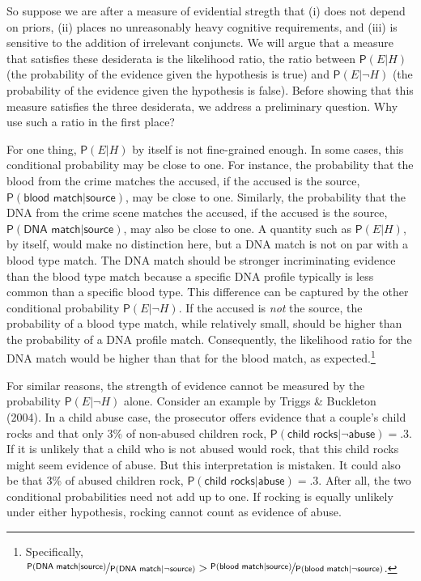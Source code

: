 \documentclass[
  10pt,
  dvipsnames,enabledeprecatedfontcommands]{scrartcl}
\newcommand{\pr}[1]{\mathsf{P}(#1)}
\begin{document}
So suppose we are after a measure of evidential stregth that (i) does
not depend on priors, (ii) places no unreasonably heavy cognitive
requirements, and (iii) is sensitive to the addition of irrelevant
conjuncts. We will argue that a measure that satisfies these desiderata
is the likelihood ratio, the ratio between \(\pr{E \vert H}\) (the
probability of the evidence given the hypothesis is true) and
\(\pr{E \vert \neg H}\) (the probability of the evidence given the
hypothesis is false). Before showing that this measure satisfies the
three desiderata, we address a preliminary question. Why use such a
ratio in the first place?

For one thing, \(\pr{E \vert H}\) by itself is not fine-grained enough.
In some cases, this conditional probability may be close to one. For
instance, the probability that the blood from the crime matches the
accused, if the accused is the source,
\(\pr{\textsf{blood match} \vert \textsf{source}}\), may be close to
one. Similarly, the probability that the DNA from the crime scene
matches the accused, if the accused is the source,
\(\pr{\textsf{DNA match} \vert \textsf{source}}\), may also be close to
one. A quantity such as \(\pr{E \vert H}\), by itself, would make no
distinction here, but a DNA match is not on par with a blood type match.
The DNA match should be stronger incriminating evidence than the blood
type match because a specific DNA profile typically is less common than
a specific blood type. This difference can be captured by the other
conditional probability \(\pr{E \vert \neg H}\). If the accused is
\textit{not} the source, the probability of a blood type match, while
relatively small, should be higher than the probability of a DNA profile
match. Consequently, the likelihood ratio for the DNA match would be
higher than that for the blood match, as expected.\footnote{Specifically,
  \(\nicefrac{\pr{\textsf{DNA match} \vert \textsf{source}}}{\pr{\textsf{DNA match} \vert \neg \textsf{source}}} > \nicefrac{\pr{\textsf{blood match} \vert \textsf{source}}}{\pr{\textsf{blood match} \vert \neg \textsf{source}}}\).}

For similar reasons, the strength of evidence cannot be measured by the
probability \(\pr{E \vert \neg H}\) alone. Consider an example by Triggs
\& Buckleton (2004). In a child abuse case, the prosecutor offers
\label{text:rock} evidence that a couple's child rocks and that only 3\%
of non-abused children rock,
\(\pr{\textsf{child rocks} \vert \neg \textsf{abuse}}=.3\). If it is
unlikely that a child who is not abused would rock, that this child
rocks might seem evidence of abuse. But this interpretation is mistaken.
It could also be that 3\% of abused children rock,
\(\pr{\textsf{child rocks} \vert \textsf{abuse}}=.3\). After all, the
two conditional probabilities need not add up to one. If rocking is
equally unlikely under either hypothesis, rocking cannot count as
evidence of abuse.
\end{document}

